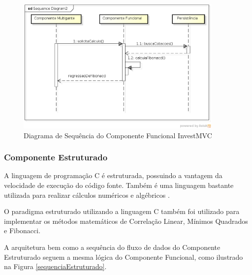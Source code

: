 \begin{figure}[H]
\centering
\includegraphics[width=0.9\textwidth]{figuras/sequenciaFuncional}
\caption{Diagrama de Sequência do Componente Funcional InvestMVC} 
\label{sequenciaFuncional}
\end{figure}

\subsubsection{Componente Estruturado}

A linguagem de programação C é estruturada, possuindo a vantagem da velocidade de execução do código fonte. Também é uma linguagem bastante utilizada para realizar cálculos numéricos e algébricos \cite{gustavo}. 

O paradigma estruturado utilizando a linguagem C também foi utilizado para implementar os métodos matemáticos de Correlação Linear, Mínimos Quadrados e Fibonacci.

A arquitetura bem como a sequência do fluxo de dados do Componente Estruturado seguem a mesma lógica do Componente Funcional, como ilustrado na Figura \ref{sequenciaEstruturado}.

